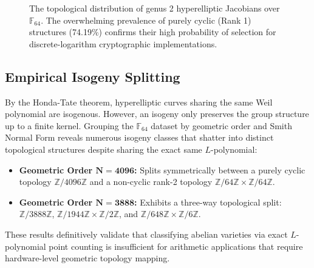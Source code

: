 \documentclass[letterpaper, 11pt]{article}
\begin{document}
\begin{figure}[htpb]
    \centering
    \caption{The topological distribution of genus 2 hyperelliptic Jacobians over $\mathbb{F}_{64}$. The overwhelming prevalence of purely cyclic (Rank 1) structures (74.19\%) confirms their high probability of selection for discrete-logarithm cryptographic implementations.}
    \label{fig:rank_distribution}
\end{figure}

\subsection{Empirical Isogeny Splitting}
By the Honda-Tate theorem, hyperelliptic curves sharing the same Weil polynomial are isogenous. However, an isogeny only preserves the group structure up to a finite kernel. Grouping the $\mathbb{F}_{64}$ dataset by geometric order and Smith Normal Form reveals numerous isogeny classes that shatter into distinct topological structures despite sharing the exact same $L$-polynomial:
\begin{itemize}
    \item \textbf{Geometric Order $\mathbf{N=4096}$:} Splits symmetrically between a purely cyclic topology $\mathbb{Z}/4096\mathbb{Z}$ and a non-cyclic rank-2 topology $\mathbb{Z}/64\mathbb{Z} \times \mathbb{Z}/64\mathbb{Z}$.
    \item \textbf{Geometric Order $\mathbf{N=3888}$:} Exhibits a three-way topological split: $\mathbb{Z}/3888\mathbb{Z}$, $\mathbb{Z}/1944\mathbb{Z} \times \mathbb{Z}/2\mathbb{Z}$, and $\mathbb{Z}/648\mathbb{Z} \times \mathbb{Z}/6\mathbb{Z}$.
\end{itemize}
These results definitively validate that classifying abelian varieties via exact $L$-polynomial point counting is insufficient for arithmetic applications that require hardware-level geometric topology mapping. 
\end{document}
